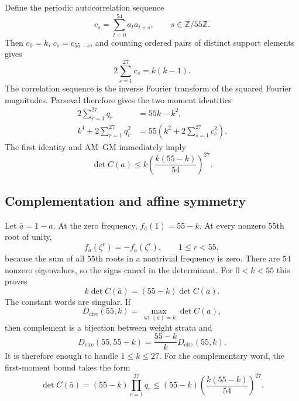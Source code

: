 \documentclass[11pt,a4paper]{article}
\theoremstyle{remark}
\DeclareMathOperator{\wt}{wt}
\newcommand{\Z}{\mathbb Z}
\begin{document}
Define the periodic autocorrelation sequence
\[
  c_s=\sum_{t=0}^{54}a_ta_{t+s},
  \qquad s\in\Z/55\Z.
\]
Then $c_0=k$, $c_s=c_{55-s}$, and counting ordered pairs of distinct
support elements gives
\begin{equation}
\label{eq:corr-sum}
  2\sum_{s=1}^{27}c_s=k(k-1).
\end{equation}
The correlation sequence is the inverse Fourier transform of the squared
Fourier magnitudes.  Parseval therefore gives the two moment identities
\begin{align}
  2\sum_{r=1}^{27}q_r&=55k-k^2, \label{eq:first-moment}\\
  k^4+2\sum_{r=1}^{27}q_r^2
    &=55\left(k^2+2\sum_{s=1}^{27}c_s^2\right).
    \label{eq:fourth-moment}
\end{align}
The first identity and AM--GM immediately imply
\begin{equation}
\label{eq:amgm}
  \det C(a)\leq k\left(\frac{k(55-k)}{54}\right)^{27}.
\end{equation}


\subsection{Complementation and affine symmetry}


Let $\bar a=1-a$.  At the zero frequency,
$f_{\bar a}(1)=55-k$.  At every nonzero $55$th root of unity,
\[
  f_{\bar a}(\zeta^r)=-f_a(\zeta^r),
  \qquad 1\leq r<55,
\]
because the sum of all $55$th roots in a nontrivial frequency is zero.
There are $54$ nonzero eigenvalues, so the signs cancel in the determinant.
For $0<k<55$ this proves
\begin{equation}
\label{eq:complement}
  k\det C(\bar a)=(55-k)\det C(a).
\end{equation}
The constant words are singular.  If
\[
  D_{\mathrm{circ}}(55,k)=
  \max_{\wt(a)=k}\det C(a),
\]
then complement is a bijection between weight strata and
\begin{equation}
\label{eq:weight-pair}
  D_{\mathrm{circ}}(55,55-k)
    =\frac{55-k}{k}D_{\mathrm{circ}}(55,k).
\end{equation}
It is therefore enough to handle $1\leq k\leq27$.  For the complementary
word, the first-moment bound takes the form
\begin{equation}
\label{eq:complement-amgm}
  \det C(\bar a)
    =(55-k)\prod_{r=1}^{27}q_r
    \leq(55-k)\left(\frac{k(55-k)}{54}\right)^{27}.
\end{equation}
\end{document}
